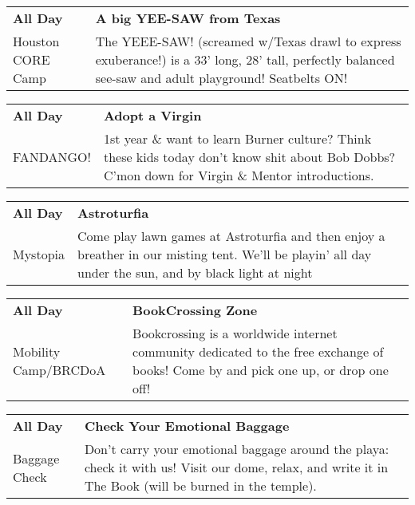 
\tiny{}

\begin{tabular}{ p{1in} p{2.2in} }
    \textbf{All Day} & \textbf{A big YEE-SAW from Texas} \\
    Houston CORE Camp \newline  & The YEEE-SAW! (screamed w/Texas drawl to express exuberance!) is a 33' long, 28' tall, perfectly balanced see-saw and adult playground! Seatbelts ON! \\
    \hline 
\end{tabular}
    
\begin{tabular}{ p{1in} p{2.2in} }
    \textbf{All Day} & \textbf{Adopt a Virgin} \\
    FANDANGO! \newline  & 1st year \& want to learn Burner culture? Think these kids today don't know shit about Bob Dobbs? C'mon down for Virgin \& Mentor introductions. \\
    \hline 
\end{tabular}
    
\begin{tabular}{ p{1in} p{2.2in} }
    \textbf{All Day} & \textbf{Astroturfia} \\
    Mystopia \newline  & Come play lawn games at Astroturfia and then enjoy a breather in our misting tent. We'll be playin' all day under the sun, and by black light at night \\
    \hline 
\end{tabular}
    
\begin{tabular}{ p{1in} p{2.2in} }
    \textbf{All Day} & \textbf{BookCrossing Zone} \\
    Mobility Camp/BRCDoA \newline  & Bookcrossing is a worldwide internet community dedicated to the free exchange of books! Come by and pick one up, or drop one off! \\
    \hline 
\end{tabular}
    
\begin{tabular}{ p{1in} p{2.2in} }
    \textbf{All Day} & \textbf{Check Your Emotional Baggage} \\
    Baggage Check \newline  & Don't carry your emotional baggage around the playa: check it with us! Visit our dome, relax, and write it in The Book (will be burned in the temple). \\
    \hline 
\end{tabular}
    
